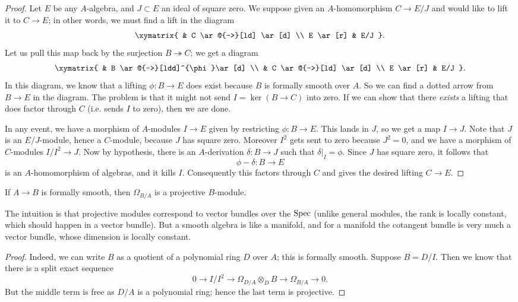 \begin{proof}
Let $E$ be any $A$-algebra, and $J \subset E$
an ideal of square zero.
We suppose given an $A$-homomorphism $C \to E/J$
and would like to lift it to $C \to E$; in other words, we must 
find a lift in the diagram
\[ \xymatrix{
& C \ar@{-->}[ld] \ar[d]  \\
E \ar[r] & E/J
}.\]
Let us pull this map back by the surjection 
$B \twoheadrightarrow C$; we get a diagram
\[ \xymatrix{
& B \ar@{-->}[ldd]^{\phi}\ar[d] \\
& C \ar@{-->}[ld] \ar[d]  \\
E \ar[r] & E/J
}.\]
In this diagram, we know that a lifting $\phi: B \to E$ does exist because $B$ is
formally smooth over $A$.
So we can find a dotted arrow from $B \to E$ in the diagram.
The problem is that it might not send
$I = \ker(B \to C) $ into zero.
If we can show that there \emph{exists} a lifting that does factor through $C$
(i.e. sends $I$ to zero), then we are done.

In any event, we have a morphism of $A$-modules
$  I \to E$  given by restricting $\phi: B \to E$.
This lands in $J$, so we get a map $I \to J$. Note that $J$ is an $E/J$-module,
hence a $C$-module, because $J$ has square zero. Moreover $I^2$ gets sent to
zero because $J^2 = 0$, and we have a morphism of
$C$-modules $I/I^2 \to J$.
Now by hypothesis, there is an $A$-derivation
$\delta: B \to J$ such that $\delta|_I = \phi$.
Since $J$ has square zero, it follows that
\[ \phi - \delta: B \to E  \]
is an $A$-homomorphism of algebras, and it kills $I$.
Consequently this factors through $C$ and gives the desired lifting $C \to E$.



\end{proof} 

\begin{corollary} \label{fsOmegaprojective}
If $A \to B$ is formally smooth, then 
$\Omega_{B/A}$ is a projective $B$-module.
\end{corollary} 
The intuition is that projective modules correspond to vector bundles
over the $\operatorname{Spec}$ (unlike general modules, the rank is locally constant,
which should happen in a vector bundle). But a smooth algebra is like a
manifold, and for a manifold the cotangent bundle is very much a vector
bundle, whose dimension is locally constant. 
\begin{proof} 
Indeed, we can write $B$ as a quotient of a polynomial ring $D$ over $A$; this
is formally smooth. Suppose $B = D/I$.
Then we know that there is a split exact sequence
\[ 0 \to I/I^2 \to \Omega_{D/A} \otimes_D B \to \Omega_{B/A} \to 0.  \]
But the middle term is free as $D/A$ is a polynomial ring; hence the last term
is projective.
\end{proof} 

